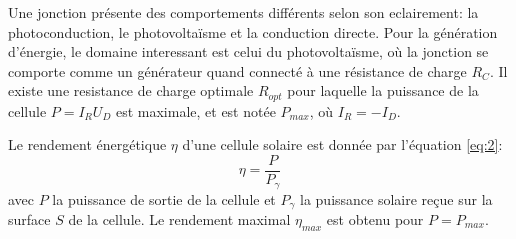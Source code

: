 Une jonction présente des comportements différents selon son eclairement: la photoconduction, le photovoltaïsme et la conduction directe.
Pour la génération d'énergie, le domaine interessant est celui du photovoltaïsme, où la jonction se comporte comme un générateur quand connecté à une résistance de charge \(R_C\).
Il existe une resistance de charge optimale \(R_{opt}\) pour laquelle la puissance de la cellule \(P = I_R U_D\) est maximale, et est notée \(P_{max}\), où \(I_R = -I_D\).

Le rendement énergétique \(\eta\) d'une cellule solaire est donnée par l'équation \ref{eq:2}:
\begin{equation}
    \eta = \frac{P}{P_\gamma}
    \label{eq:2}
\end{equation}
avec \(P\) la puissance de sortie de la cellule et \(P_\gamma\) la puissance solaire reçue sur la surface \(S\) de la cellule.
Le rendement maximal \(\eta_{max}\) est obtenu pour \(P = P_{max}\).
